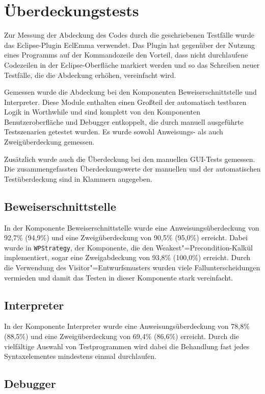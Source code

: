 \section{Überdeckungstests}
Zur Messung der Abdeckung des Codes durch die geschriebenen Testfälle wurde das Eclipse-Plugin EclEmma verwendet. Das Plugin hat gegenüber der Nutzung eines Programms auf der Kommandozeile den Vorteil, dass nicht durchlaufene Codezeilen in der Eclipse-Oberfläche markiert werden und so das Schreiben neuer Testfälle, die die Abdeckung erhöhen, vereinfacht wird.

Gemessen wurde die Abdeckung bei den Komponenten Beweiserschnittstelle und Interpreter. Diese Module enthalten einen Großteil der automatisch testbaren Logik in Worthwhile und sind komplett von den Komponenten Benutzeroberfläche und Debugger entkoppelt, die durch manuell ausgeführte Testszenarien getestet wurden. Es wurde sowohl Anweisungs- als auch Zweigüberdeckung gemessen.

Zusätzlich wurde auch die Überdeckung bei den manuellen GUI-Tests gemessen. Die zusammengefassten Überdeckungswerte der manuellen und der automatischen Testüberdeckung sind in Klammern angegeben.

\subsection{Beweiserschnittstelle}
In der Komponente Beweiserschnittstelle wurde eine Anweisungsüberdeckung von 92,7\% (94,9\%) und eine Zweigüberdeckung von 90,5\% (95,0\%) erreicht. Dabei wurde in \texttt{WPStrategy}, der Komponente, die den Weakest"=Precondition-Kalkül implementiert, sogar eine Zweigabdeckung von 93,8\% (100,0\%) erreicht. Durch die Verwendung des Visitor"=Entwurfsmusters wurden viele Fallunterscheidungen vermieden und damit das Testen in dieser Komponente stark vereinfacht.

\subsection{Interpreter}
In der Komponente Interpreter wurde eine Anweisungsüberdeckung von 78,8\% (88,5\%) und eine Zweigüberdeckung von 69,4\% (86,6\%) erreicht. Durch die vielfältige Auswahl von Testprogrammen wird dabei die Behandlung fast jedes Syntaxelementes mindestens einmal durchlaufen.

\subsection{Debugger}

